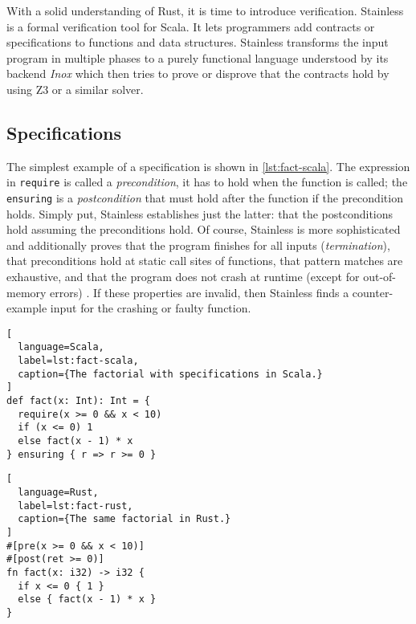 With a solid understanding of Rust, it is time to introduce verification.
Stainless \cite{stainless} is a formal verification tool for Scala. It lets
programmers add contracts or specifications to functions and data structures.
Stainless transforms the input program in multiple phases to a purely functional
language understood by its backend \emph{Inox} \cite{inox} which then tries to
prove or disprove that the contracts hold by using Z3 \cite{z3} or a similar
solver.

\subsection{Specifications}

The simplest example of a specification is shown in \autoref{lst:fact-scala}.
The expression in \lstinline!require! is called a \emph{precondition}, it has to
hold when the function is called; the \lstinline!ensuring! is a
\emph{postcondition} that must hold after the function if the precondition
holds. Simply put, Stainless establishes just the latter: that the
postconditions hold assuming the preconditions hold. Of course, Stainless is
more sophisticated and additionally proves that the program finishes for all
inputs (\emph{termination}), that preconditions hold at static call sites of
functions, that pattern matches are exhaustive, and that the program does not
crash at runtime (except for out-of-memory errors) \cite{stainless-doc}. If
these properties are invalid, then Stainless finds a counter-example input for
the crashing or faulty function.

\noindent\begin{minipage}[t]{.47\textwidth}
\begin{lstlisting}[
  language=Scala,
  label=lst:fact-scala,
  caption={The factorial with specifications in Scala.}
]
def fact(x: Int): Int = {
  require(x >= 0 && x < 10)
  if (x <= 0) 1
  else fact(x - 1) * x
} ensuring { r => r >= 0 }
\end{lstlisting}
\end{minipage}\hfill
\begin{minipage}[t]{.47\textwidth}
\begin{lstlisting}[
  language=Rust,
  label=lst:fact-rust,
  caption={The same factorial in Rust.}
]
#[pre(x >= 0 && x < 10)]
#[post(ret >= 0)]
fn fact(x: i32) -> i32 {
  if x <= 0 { 1 }
  else { fact(x - 1) * x }
}
\end{lstlisting}
\end{minipage}

